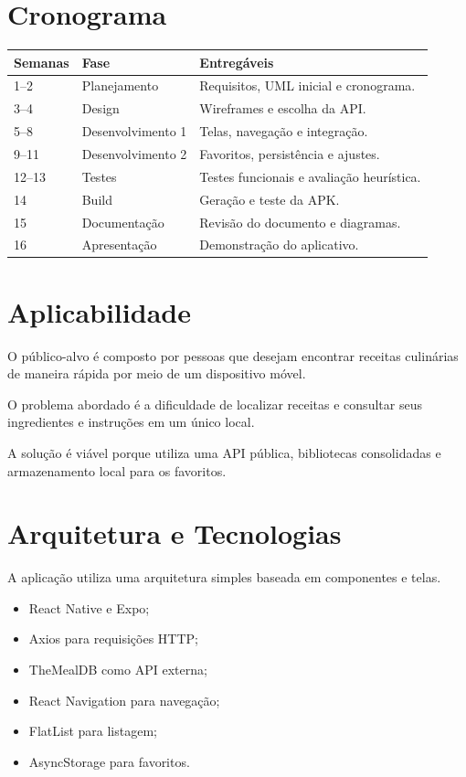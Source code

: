 \documentclass[12pt,a4paper]{article}
\begin{document}
\section{Cronograma}

\begin{longtable}{p{2cm}p{5cm}p{5cm}}
\toprule
Semanas & Fase & Entregáveis\\
\midrule
1--2 & Planejamento & Requisitos, UML inicial e cronograma.\\
3--4 & Design & Wireframes e escolha da API.\\
5--8 & Desenvolvimento 1 & Telas, navegação e integração.\\
9--11 & Desenvolvimento 2 & Favoritos, persistência e ajustes.\\
12--13 & Testes & Testes funcionais e avaliação heurística.\\
14 & Build & Geração e teste da APK.\\
15 & Documentação & Revisão do documento e diagramas.\\
16 & Apresentação & Demonstração do aplicativo.\\
\bottomrule
\end{longtable}

\section{Aplicabilidade}

O público-alvo é composto por pessoas que desejam encontrar receitas culinárias de maneira rápida por meio de um dispositivo móvel.

O problema abordado é a dificuldade de localizar receitas e consultar seus ingredientes e instruções em um único local.

A solução é viável porque utiliza uma API pública, bibliotecas consolidadas e armazenamento local para os favoritos.

\section{Arquitetura e Tecnologias}

A aplicação utiliza uma arquitetura simples baseada em componentes e telas.

\begin{itemize}
\item React Native e Expo;
\item Axios para requisições HTTP;
\item TheMealDB como API externa;
\item React Navigation para navegação;
\item FlatList para listagem;
\item AsyncStorage para favoritos.
\end{itemize}
\end{document}
